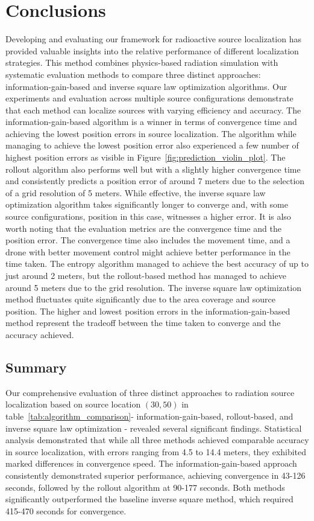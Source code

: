 \documentclass[../report.tex]{subfiles}
\begin{document}
    \section{Conclusions}
    \label{sec:conclusions}
    Developing and evaluating our framework for radioactive source localization has provided valuable insights into the relative performance of different 
    localization strategies. This method combines physics-based radiation simulation with systematic evaluation methods to compare three distinct approaches: information-gain-based
    and inverse square law optimization algorithms. Our experiments and evaluation across multiple source configurations demonstrate that each method can localize sources with
    varying efficiency and accuracy. The information-gain-based algorithm is a winner in terms of convergence time and achieving the lowest
    position errors in source localization. The algorithm while managing to achieve the lowest position error also experienced a few number of highest position errors as visible in Figure~\ref{fig:prediction_violin_plot}. 
    The rollout algorithm also performs well but with a slightly higher convergence time and consistently predicts a position error of around 7 meters due to the selection of a grid resolution of 5 meters. While effective, the inverse square law optimization algorithm 
    takes significantly longer to converge and, with some source configurations, position in this case, witnesses a higher error. It is also worth noting that the evaluation metrics are the convergence time and the position error. The convergence time also includes the movement time, and a 
    drone with better movement control might achieve better performance in the time taken. The entropy algorithm managed to achieve the best accuracy of up to
    just around 2 meters, but the rollout-based method has managed to achieve around 5 meters due to the grid resolution. The inverse square law optimization 
    method fluctuates quite significantly due to the area coverage and source position. The higher and lowest position errors in the information-gain-based method represent the tradeoff between 
    the time taken to converge and the accuracy achieved. 

    \subsection{Summary}
    \label{sec:conclusions:summary}

    Our comprehensive evaluation of three distinct approaches to radiation source localization based on source location $(30,50)$ in 
    table~\ref{tab:algorithm_comparison}- information-gain-based, rollout-based, and inverse square law 
    optimization - revealed several significant findings. Statistical analysis demonstrated that while all three methods achieved comparable accuracy in source 
    localization, with errors ranging from 4.5 to 14.4 meters, they exhibited marked differences in convergence speed. The information-gain-based approach 
    consistently demonstrated superior performance, achieving convergence in 43-126 seconds, followed by the rollout algorithm at 90-177 seconds. Both methods 
    significantly outperformed the baseline inverse square method, which required 415-470 seconds for convergence.
\end{document}
